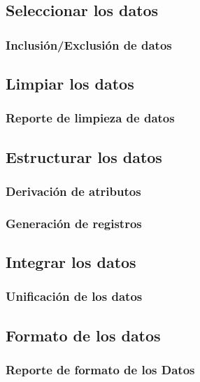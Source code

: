 \subsection{Seleccionar los datos}
    \subsubsection{Inclusión/Exclusión de datos}
\subsection{Limpiar los datos}
    \subsubsection{Reporte de limpieza de datos}
\subsection{Estructurar los datos}
    \subsubsection{Derivación de atributos}
    \subsubsection{Generación de registros}
\subsection{Integrar los datos}
    \subsubsection{Unificación de los datos}
\subsection{Formato de los datos}
    \subsubsection{Reporte de formato de los Datos}